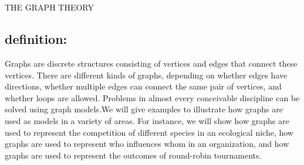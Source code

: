 \documentclass[12pt,letterpaper]{report}
\begin{document}
\chapter{}
\begin{center}
\textsc{\Huge {\color{blue}T}{\color{magenta}HE GRAPH THEORY}}\\
\end{center}
\section{definition: }


 {\Huge \color{red}G}raphs are discrete structures consisting of vertices and edges that connect these vertices.
There are different kinds of graphs, depending on whether edges have directions, whether
multiple edges can connect the same pair of vertices, and whether loops are allowed. Problems
in almost every conceivable discipline can be solved using graph models.We will give examples
to illustrate how graphs are used as models in a variety of areas. For instance, we will show how
graphs are used to represent the competition of different species in an ecological niche, how
graphs are used to represent who influences whom in an organization, and how graphs are used
to represent the outcomes of round-robin tournaments.\\
[0.7cm]
\end{document}
